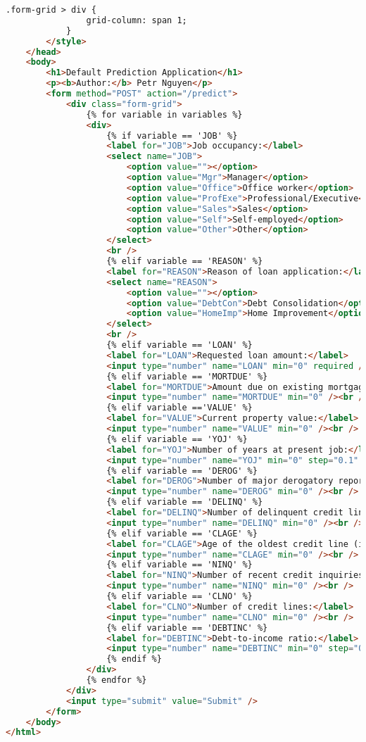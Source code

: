 \begin{lstlisting}[language=HTML, basicstyle=\footnotesize\ttfamily]
			.form-grid > div {
				grid-column: span 1;
			}
		</style>
	</head>
	<body>
		<h1>Default Prediction Application</h1>
		<p><b>Author:</b> Petr Nguyen</p>
		<form method="POST" action="/predict">
			<div class="form-grid">
				{% for variable in variables %}
				<div>
					{% if variable == 'JOB' %}
					<label for="JOB">Job occupancy:</label>
					<select name="JOB">
						<option value=""></option>
						<option value="Mgr">Manager</option>
						<option value="Office">Office worker</option>
						<option value="ProfExe">Professional/Executive</option>
						<option value="Sales">Sales</option>
						<option value="Self">Self-employed</option>
						<option value="Other">Other</option>
					</select>
					<br />
					{% elif variable == 'REASON' %}
					<label for="REASON">Reason of loan application:</label>
					<select name="REASON">
						<option value=""></option>
						<option value="DebtCon">Debt Consolidation</option>
						<option value="HomeImp">Home Improvement</option>
					</select>
					<br />
					{% elif variable == 'LOAN' %}
					<label for="LOAN">Requested loan amount:</label>
					<input type="number" name="LOAN" min="0" required /><br />
					{% elif variable == 'MORTDUE' %}
					<label for="MORTDUE">Amount due on existing mortgage:</label>
					<input type="number" name="MORTDUE" min="0" /><br />
					{% elif variable =='VALUE' %}
					<label for="VALUE">Current property value:</label>
					<input type="number" name="VALUE" min="0" /><br />
					{% elif variable == 'YOJ' %}
					<label for="YOJ">Number of years at present job:</label>
					<input type="number" name="YOJ" min="0" step="0.1" /><br />
					{% elif variable == 'DEROG' %}
					<label for="DEROG">Number of major derogatory reports:</label>
					<input type="number" name="DEROG" min="0" /><br />
					{% elif variable == 'DELINQ' %}
					<label for="DELINQ">Number of delinquent credit lines:</label>
					<input type="number" name="DELINQ" min="0" /><br />
					{% elif variable == 'CLAGE' %}
					<label for="CLAGE">Age of the oldest credit line (in months):</label>
					<input type="number" name="CLAGE" min="0" /><br />
					{% elif variable == 'NINQ' %}
					<label for="NINQ">Number of recent credit inquiries:</label>
					<input type="number" name="NINQ" min="0" /><br />
					{% elif variable == 'CLNO' %}
					<label for="CLNO">Number of credit lines:</label>
					<input type="number" name="CLNO" min="0" /><br />
					{% elif variable == 'DEBTINC' %}
					<label for="DEBTINC">Debt-to-income ratio:</label>
					<input type="number" name="DEBTINC" min="0" step="0.0000001" /><br />
					{% endif %}
				</div>
				{% endfor %}
			</div>
			<input type="submit" value="Submit" />
		</form>
	</body>
</html>	
\end{lstlisting}

